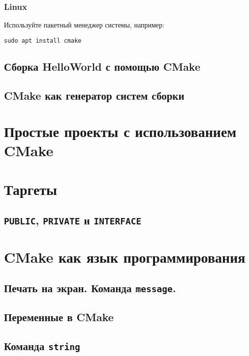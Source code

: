 \documentclass{article}
\begin{document}
\subsubsection*{Linux}
Используйте пакетный менеджер системы, например:
\begin{verbatim}
sudo apt install cmake
\end{verbatim}

\subsection*{Сборка HelloWorld с помощью CMake}

\subsection*{CMake как генератор систем сборки}


\newpage
\section{Простые проекты с использованием CMake}

\section{Таргеты}

\subsection*{\texttt{PUBLIC}, \texttt{PRIVATE} и \texttt{INTERFACE}}

\section{CMake как язык программирования}


\subsection*{Печать на экран. Команда \texttt{message}.}

\subsection*{Переменные в CMake}

\subsection*{Команда \texttt{string}}
\end{document}
